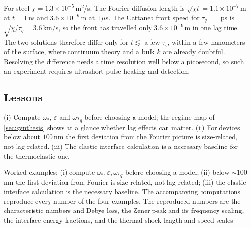 For steel $\chi=1.3\times10^{-5}$\,m$^2$/s. The Fourier diffusion length is $\sqrt{\chi t}=1.1\times10^{-7}$\,m at $t=1$\,ns and $3.6\times10^{-6}$\,m at $1\,\mu$s. The Cattaneo front speed for $\tau_q=1$\,ps is $\sqrt{\chi/\tau_q}=3.6$\,km/s, so the front has travelled only $3.6\times10^{-9}$\,m in one lag time. The two solutions therefore differ only for $t\lesssim$ a few $\tau_q$, within a few nanometers of the surface, where continuum theory and a bulk $k$ are already doubtful. Resolving the difference needs a time resolution well below a picosecond, so such an experiment requires ultrashort-pulse heating and detection.

\subsection{Lessons}
(i) Compute $\omega_*$, $\varepsilon$ and $\omega\tau_q$ before choosing a model; the regime map of \cref{sec:synthesis} shows at a glance whether lag effects can matter. (ii) For devices below about $100$\,nm the first deviation from the Fourier picture is size-related, not lag-related. (iii) The elastic interface calculation is a necessary baseline for the thermoelastic one.


\begin{summarybox}[Summary]
Worked examples: (i) compute $\omega_*,\varepsilon,\omega\tau_q$ before choosing a model; (ii) below $\sim100$\,nm the first deviation from Fourier is size-related, not lag-related; (iii) the elastic interface calculation is the necessary baseline. The accompanying computations reproduce every number of the four examples. The reproduced numbers are the characteristic numbers and Debye loss, the Zener peak and its frequency scaling, the interface energy fractions, and the thermal-shock length and speed scales.
\end{summarybox}